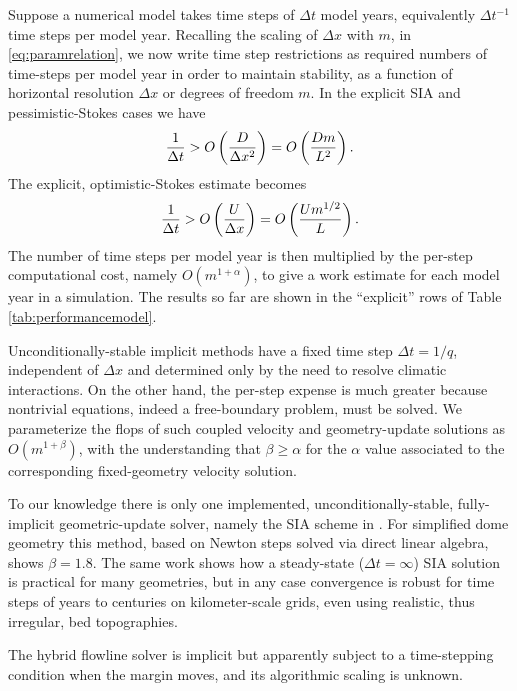 \documentclass[twocolumn,letterpaper]{igs}
\begin{document}
Suppose a numerical model takes time steps of $\Delta t$ model years, equivalently $\Delta t^{-1}$ time steps per model year.  Recalling the scaling of $\Delta x$ with $m$, in \eqref{eq:paramrelation}, we now write time step restrictions as required numbers of time-steps per model year in order to maintain stability, as a function of horizontal resolution $\Delta x$ or degrees of freedom $m$.  In the explicit SIA and pessimistic-Stokes cases we have
\begin{equation}
\frac{1}{\Delta t} > \displaystyle O\left(\frac{D}{\Delta x^2}\right) = \displaystyle O\left(\frac{D m}{L^2}\right). \label{eq:explicitsiarequired}
\end{equation}
The explicit, optimistic-Stokes estimate becomes
\begin{equation}
\frac{1}{\Delta t} > \displaystyle O\left(\frac{U}{\Delta x}\right) = \displaystyle O\left(\frac{U m^{1/2}}{L}\right). \label{eq:explicitoptstokesrequired}
\end{equation}
The number of time steps per model year is then multiplied by the per-step computational cost, namely $O(m^{1+\alpha})$, to give a work estimate for each model year in a simulation.  The results so far are shown in the ``explicit'' rows of Table \ref{tab:performancemodel}.

Unconditionally-stable implicit methods have a fixed time step $\Delta t = 1/q$, independent of $\Delta x$ and determined only by the need to resolve climatic interactions.  On the other hand, the per-step expense is much greater because nontrivial equations, indeed a free-boundary problem, must be solved.  We parameterize the flops of such coupled velocity and geometry-update solutions as $O(m^{1+\beta})$, with the understanding that $\beta \ge \alpha$ for the $\alpha$ value associated to the corresponding fixed-geometry velocity solution.

To our knowledge there is only one implemented, unconditionally-stable, fully-implicit geometric-update solver, namely the SIA scheme in \cite{Bueler2016}.  For simplified dome geometry this method, based on Newton steps solved via direct linear algebra, shows $\beta=1.8$.
The same work shows how a steady-state ($\Delta t=\infty$) SIA solution is practical for many geometries, but in any case convergence is robust for time steps of years to centuries on kilometer-scale grids, even using realistic, thus irregular, bed topographies.

The hybrid \cite{Brinkerhoffetal2017} flowline solver is implicit but apparently subject to a time-stepping condition when the margin moves, and its algorithmic scaling is unknown.
\end{document}
